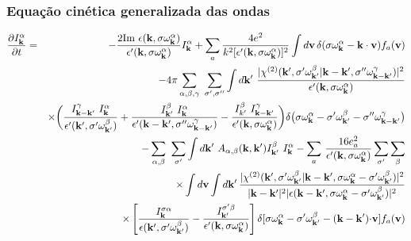\documentclass[10pt,aspectratio=1610,lualatex]{beamer}
\begin{document}
\begin{frame}
  \frametitle{Equação cinética generalizada das ondas}
  \begin{eqnarray}
  \frac{\partial I^\alpha_{\bf k}}{\partial t}
    &=&-\frac{2 \mbox{Im}\ \epsilon({\bf k}, \sigma \omega_{\bf k}^\alpha)}
    {\epsilon '({\bf k},\sigma \omega_{\bf k}^\alpha)}I^\alpha_{\bf k}
    +\sum_a\frac{4e^2}{k^2[\epsilon '({\bf k},\sigma\omega_{\bf k}^\alpha)]^2}
    \int d{\bf v}\, \delta(\sigma\omega_{\bf k}^\alpha-{\bf k \cdot v})f_a({\bf v})
	\nonumber\\
      &&-4\pi \sum_{\alpha,\beta,\gamma}\ \sum_{\sigma ',\sigma ''}\int d{\bf k '}\
    \frac{|\chi^{(2)}({\bf k'},\sigma '\omega_{\bf k'}^\beta|{\bf k-k'},
      \sigma ''\omega_{\bf k-k'}^\gamma)|^2}
    {\epsilon '({\bf k},\sigma \omega_{\bf k}^{\alpha})}
    \nonumber\\
      &&\times \biggl(\frac{I_{\bf k-k'}^{\gamma}\ I_{\bf k}^{\alpha}}
       {\epsilon '({\bf k'},\sigma ' \omega_{\bf k'}^{\beta})}
       +\frac{I_{\bf k'}^{\beta}\ I_{\bf k}^{\alpha}}
       {\epsilon '({\bf k-k'},\sigma ''\omega_{\bf k-k'}^{\gamma})}
       -\frac{I_{k'}^{\beta}\ I_{\bf k-k'}^{\gamma}}
       {\epsilon '({\bf k},\sigma \omega_{\bf k}^{\alpha})}\biggr)
       \delta\bigl(\sigma \omega_{\bf k}^{\alpha}-\sigma ' \omega_{\bf k'}^{\beta}
	 -\sigma '' \omega_{\bf k-k'}^{\gamma}\bigr)
    \nonumber\\
    &&-\sum_{\alpha,\beta}\ \sum_{\sigma '}
    \int d{\bf k '}\ A_{\alpha,\beta}({\bf k,k'})
    I_{\bf k'}^{\beta}\ I_{\bf k}^{\alpha}
       -\sum_a\,\frac{16 e_a^2}{\epsilon '({\bf k},\sigma\omega_{\bf k}^\alpha)}
       \sum_{\sigma '}\sum_{\beta}
    \nonumber\\
    &&\times\int d{\bf v}\int d{\bf k '}\,
    \frac{|\chi^{(2)}({\bf k'},\sigma '\omega_{\bf k'}^{\beta}|{\bf k-k'},
      \sigma \omega_{\bf k}^\alpha-\sigma '\omega_{\bf k'}^{\beta})|^2}
    {|{\bf k-k'}|^2|\epsilon({\bf k-k'},\sigma \omega_{\bf k}^\alpha
      -\sigma '\omega_{\bf k'}^{\beta})|^2}
    \nonumber\\
    &&\times \left[ \frac{I_{\bf k}^{\sigma \alpha}}
      {\epsilon({\bf k '},\sigma '\omega_{\bf k'}^\beta)}
    -\frac{I_{\bf k'}^{\sigma '\beta}}
    {\epsilon '({\bf k },\sigma \omega_{\bf k}^\alpha)}\right]
   \delta[\sigma \omega_{\bf k}^\alpha-\sigma '\omega_{\bf k'}^\beta
       -({\bf k-k'}){\bf \cdot v}] f_a({\bf v})
       \nonumber
  \end{eqnarray}
\end{frame}
\end{document}

